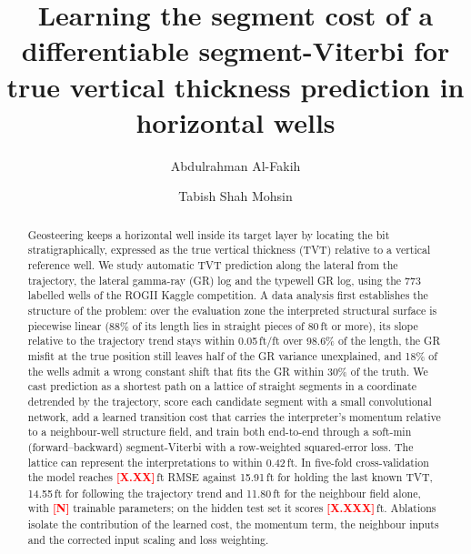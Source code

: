 \documentclass[preprint,12pt,authoryear]{elsarticle}
\newcommand{\PH}[1]{\textcolor{red}{\textbf{[#1]}}}
\begin{document}
\begin{frontmatter}

\title{Learning the segment cost of a differentiable segment-Viterbi for true vertical thickness prediction in horizontal wells}

\author[kfupm]{Abdulrahman Al-Fakih}
\author[amu]{Tabish Shah Mohsin}

\begin{abstract}
Geosteering keeps a horizontal well inside its target layer by locating the bit stratigraphically, expressed as the true vertical thickness (TVT) relative to a vertical reference well. We study automatic TVT prediction along the lateral from the trajectory, the lateral gamma-ray (GR) log and the typewell GR log, using the 773 labelled wells of the ROGII Kaggle competition. A data analysis first establishes the structure of the problem: over the evaluation zone the interpreted structural surface is piecewise linear (88\% of its length lies in straight pieces of 80\,ft or more), its slope relative to the trajectory trend stays within 0.05\,ft/ft over 98.6\% of the length, the GR misfit at the true position still leaves half of the GR variance unexplained, and 18\% of the wells admit a wrong constant shift that fits the GR within 30\% of the truth. We cast prediction as a shortest path on a lattice of straight segments in a coordinate detrended by the trajectory, score each candidate segment with a small convolutional network, add a learned transition cost that carries the interpreter's momentum relative to a neighbour-well structure field, and train both end-to-end through a soft-min (forward--backward) segment-Viterbi with a row-weighted squared-error loss. The lattice can represent the interpretations to within 0.42\,ft. In five-fold cross-validation the model reaches \PH{X.XX}\,ft RMSE against 15.91\,ft for holding the last known TVT, 14.55\,ft for following the trajectory trend and 11.80\,ft for the neighbour field alone, with \PH{N} trainable parameters; on the hidden test set it scores \PH{X.XXX}\,ft. Ablations isolate the contribution of the learned cost, the momentum term, the neighbour inputs and the corrected input scaling and loss weighting.
\end{abstract}


\end{frontmatter}
\end{document}
